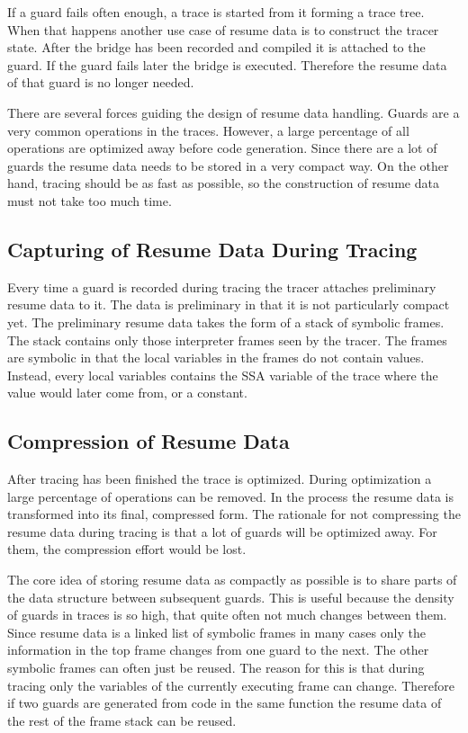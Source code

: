 \documentclass[10pt,preprint]{sigplanconf}
\begin{document}
If a guard fails often enough, a trace is started from it
forming a trace tree.
When that happens another use case of resume data
is to construct the tracer state.
After the bridge has been recorded and compiled it is attached to the guard.
If the guard fails later the bridge is executed. Therefore the resume data of
that guard is no longer needed.

There are several forces guiding the design of resume data handling.
Guards are a very common operations in the traces.
However, a large percentage of all operations
are optimized away before code generation.
Since there are a lot of guards
the resume data needs to be stored in a very compact way.
On the other hand, tracing should be as fast as possible,
so the construction of resume data must not take too much time.

\subsection{Capturing of Resume Data During Tracing}
\label{sub:capturing}

Every time a guard is recorded during tracing
the tracer attaches preliminary resume data to it.
The data is preliminary in that it is not particularly compact yet.
The preliminary resume data takes the form of a stack of symbolic frames.
The stack contains only those interpreter frames seen by the tracer.
The frames are symbolic in that the local variables in the frames
do not contain values.
Instead, every local variables contains the SSA variable of the trace
where the value would later come from, or a constant.

\subsection{Compression of Resume Data}
\label{sub:compression}

After tracing has been finished the trace is optimized.
During optimization a large percentage of operations can be removed.
In the process the resume data is transformed into its final, compressed form.
The rationale for not compressing the resume data during tracing
is that a lot of guards will be optimized away.
For them, the compression effort would be lost.

The core idea of storing resume data as compactly as possible
is to share parts of the data structure between subsequent guards.
This is useful because the density of guards in traces is so high,
that quite often not much changes between them.
Since resume data is a linked list of symbolic frames
in many cases only the information in the top frame changes from one guard to the next.
The other symbolic frames can often just be reused.
The reason for this is that during tracing only the variables
of the currently executing frame can change.
Therefore if two guards are generated from code in the same function
the resume data of the rest of the frame stack can be reused.
\end{document}
